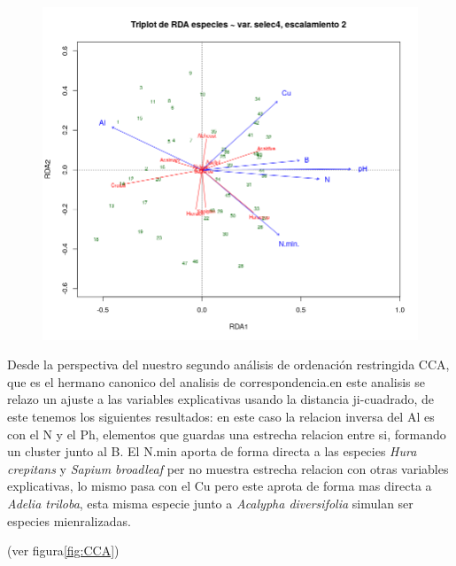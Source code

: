 \documentclass[11pt,]{article}
\begin{document}
\begin{figure}
\centering
\includegraphics{PCA_RDA.png}
\caption{\label{fig:PCA_RDA}}
\end{figure}

Desde la perspectiva del nuestro segundo análisis de ordenación
restringida CCA, que es el hermano canonico del analisis de
correspondencia.en este analisis se relazo un ajuste a las variables
explicativas usando la distancia ji-cuadrado, de este tenemos los
siguientes resultados: en este caso la relacion inversa del Al es con el
N y el Ph, elementos que guardas una estrecha relacion entre si,
formando un cluster junto al B. El N.min aporta de forma directa a las
especies \emph{Hura crepitans} y \emph{Sapium broadleaf} per no muestra
estrecha relacion con otras variables explicativas, lo mismo pasa con el
Cu pero este aprota de forma mas directa a \emph{Adelia triloba}, esta
misma especie junto a \emph{Acalypha diversifolia} simulan ser especies
mienralizadas.

(ver figura\ref{fig:CCA})
\end{document}
